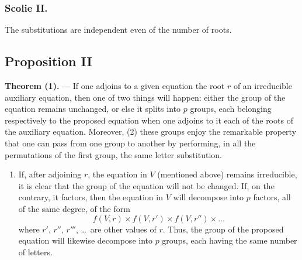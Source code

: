 \documentclass{article}
\begin{document}
\subsubsection*{Scolie II.}
The substitutions are independent even of the number of roots.

\subsection*{Proposition II}

\textbf{Theorem (1).} --- If one adjoins to a given equation the root $r$ of an irreducible auxiliary equation, then one of two things will happen: either the group of the equation remains unchanged, or else it splits into $p$ groups, each belonging respectively to the proposed equation when one adjoins to it each of the roots of the auxiliary equation. Moreover, (2) these groups enjoy the remarkable property that one can pass from one group to another by performing, in all the permutations of the first group, the same letter substitution.

\begin{enumerate}
\item If, after adjoining $r$, the equation in $V$ (mentioned above) remains irreducible, it is clear that the group of the equation will not be changed. If, on the contrary, it factors, then the equation in $V$ will decompose into $p$ factors, all of the same degree, of the form
\[
f(V,r) \times f(V,r') \times f(V,r'') \times \dots
\]
where $r'$, $r''$, $r'''$, \dots\ are other values of $r$. Thus, the group of the proposed equation will likewise decompose into $p$ groups, each having the same number of letters.
\end{enumerate}

\end{document}
